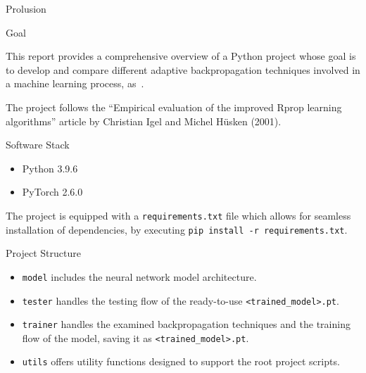 \begin{chapter}{Prolusion}
    \begin{section}{Goal}
        \par This report provides a comprehensive overview of a Python project whose goal is to develop and compare different adaptive backpropagation techniques involved in a machine learning process, as~.
		\par The project follows the ``Empirical evaluation of the improved Rprop learning algorithms'' article by Christian Igel and Michel Hüsken (2001).
    \end{section}
    \newpage
	\begin{section}{Software Stack}
		\begin{itemize}
			\item Python 3.9.6
			\item PyTorch 2.6.0
		\end{itemize}
		The project is equipped with a \texttt{requirements.txt} file which allows for seamless installation of dependencies, by executing \texttt{pip install -r requirements.txt}.
	\end{section}
	\newpage
	\begin{section}{Project Structure}
		\medskip
		\begin{itemize}
			\item \texttt{model} includes the neural network model architecture.
			\item \texttt{tester} handles the testing flow of the ready-to-use \texttt{<trained\_model>.pt}.
			\item \texttt{trainer} handles the examined backpropagation techniques and the training flow of the model, saving it as \texttt{<trained\_model>.pt}.
			\item \texttt{utils} offers utility functions designed to support the root project scripts.
		\end{itemize}
	\end{section}
\end{chapter}